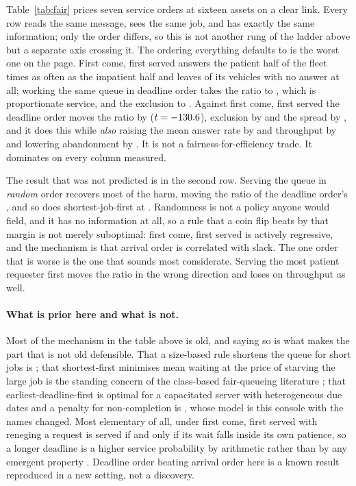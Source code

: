 \documentclass[11pt]{article}
\begin{document}
Table~\ref{tab:fair} prices seven service orders at sixteen assets on a clear link. Every row reads
the same message, sees the same job, and has exactly the same information; only the order differs,
so this is not another rung of the ladder above but a separate axis crossing it. The ordering
everything defaults to is the worst one on the page. First come, first served answers the patient
half of the fleet \FrLvFcfsRatio{} times as often as the impatient half and leaves
\FrLvFcfsStarv{} of its vehicles with no answer at all; working the same queue in deadline order
takes the ratio to \FrLvEdfRatio{}, which is proportionate service, and the exclusion to
\FrLvEdfStarv{}. Against first come, first served the deadline order moves the ratio by
\FrEdfRatio{} ($t = -130.6{}$), exclusion by \FrEdfStarv{} and the spread by \FrEdfIqr{}, and
it does this while \emph{also} raising the mean answer rate by \FrEdfRate{} and throughput by
\FrEdfSrv{} and lowering abandonment by \FrEdfAband{}. It is not a fairness-for-efficiency trade. It
dominates on every column measured.

The result that was not predicted is in the second row. Serving the queue in \emph{random} order
recovers most of the harm, moving the ratio \FrRandRatio{} of the deadline order's \FrEdfRatio{},
and so does shortest-job-first at \FrEasyRatio{}. Randomness is not a policy anyone would field, and
it has no information at all, so a rule that a coin flip beats by that margin is not merely
suboptimal: first come, first served is actively regressive, and the mechanism is that arrival order
is correlated with slack. The one order that is worse is the one that sounds most considerate.
Serving the most patient requester first moves the ratio \FrPatRatio{} in the wrong direction and
loses on throughput as well.

\paragraph{What is prior here and what is not.} Most of the mechanism in the table above is old, and
saying so is what makes the part that is not old defensible. That a size-based rule shortens the
queue for short jobs is \citet{kleinrock1964timeshared}; that shortest-first minimises mean waiting
at the price of starving the large job is the standing concern of the class-based fair-queueing
literature \citep{khayari2005classbased}; that earliest-deadline-first is optimal for a capacitated
server with heterogeneous due dates and a penalty for non-completion is
\citet{xu2016duedate}, whose model is this console with the names changed. Most elementary of all,
under first come, first served with reneging a request is served if and only if its wait falls
inside its own patience, so a longer deadline is a higher service probability by arithmetic rather
than by any emergent property \citep{barrer1957ordered}. Deadline order beating arrival order here is
a known result reproduced in a new setting, not a discovery.
\end{document}
